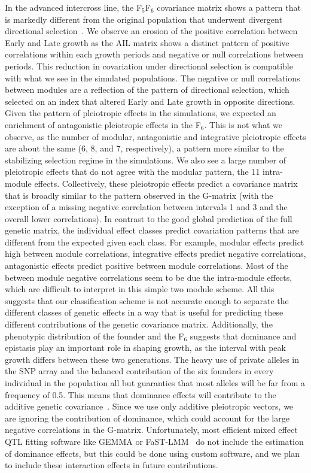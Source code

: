 \begin{refsection}
In the advanced intercross line, the F$_{\text{5}}$F$_{\text{6}}$ covariance
matrix shows a pattern that is markedly different from the original population
that underwent divergent directional selection~\parencite{Atchley1997-vn}. We
observe an erosion of the positive correlation between Early and Late growth
as the AIL matrix shows a distinct pattern of positive correlations within
each growth periods and negative or null correlations between periods. This
reduction in covariation under directional selection is compatible with what
we see in the simulated populations. The negative or null correlations between
modules are a reflection of the pattern of directional selection, which
selected on an index that altered Early and Late growth in opposite
directions. Given the pattern of pleiotropic effects in the simulations, we
expected an enrichment of antagonistic pleiotropic effects in the
F$_{\text{6}}$. This is not what we observe, as the number of modular,
antagonistic and integrative pleiotropic effects are about the same (6, 8, and
7, respectively), a pattern more similar to the stabilizing selection regime
in the simulations. We also see a large number of pleiotropic effects that do
not agree with the modular pattern, the 11 intra-module effects. Collectively,
these pleiotropic effects predict a covariance matrix that is broadly similar
to the pattern observed in the G-matrix (with the exception of a missing
negative correlation between intervals 1 and 3 and the overall lower
correlations). In contrast to the good global prediction of the full genetic
matrix, the individual effect classes predict covariation patterns that are
different from the expected given each class. For example, modular effects
predict high between module correlations, integrative effects predict negative
correlations, antagonistic effects predict positive between module
correlations. Most of the between module negative correlations seem to be due
the intra-module effects, which are difficult to interpret in this simple two
module scheme. All this suggests that our classification scheme is not
accurate enough to separate the different classes of genetic effects in a way
that is useful for predicting these different contributions of the genetic
covariance matrix. Additionally, the phenotypic distribution of the founder
and the F$_{\text{6}}$ suggests that dominance and epistasis play an important
role in shaping growth, as the interval with peak growth differs between these
two generations. The heavy use of private alleles in the SNP array and the
balanced contribution of the six founders in every individual in the
population all but guaranties that most alleles will be far from a frequency
of 0.5. This means that dominance effects will contribute to the additive
genetic covariance~\parencite{Falconer1978-kq, Lynch1998-ql}. Since we use
only additive pleiotropic vectors, we are ignoring the contribution of
dominance, which could account for the large negative correlations in the
G-matrix. Unfortunately, most efficient mixed effect QTL fitting software like
GEMMA or FaST-LMM~\parencite{Lippert2011-jn} do not include the estimation of
dominance effects, but this could be done using custom software, and we plan
to include these interaction effects in future contributions. 


\end{refsection}
